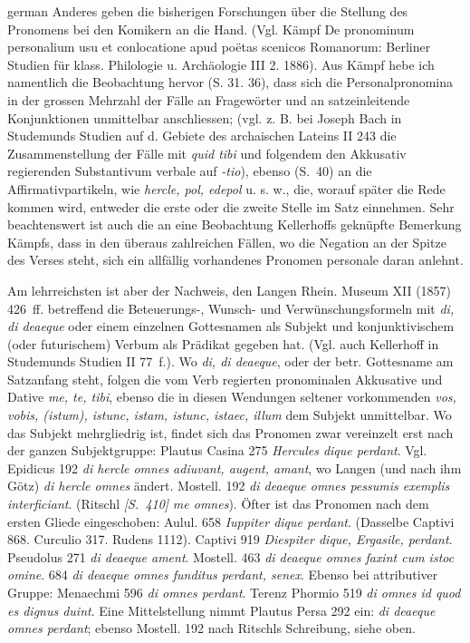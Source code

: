 \begin{otherlanguage*}{german}
Anderes geben die bisherigen Forschungen über die Stellung des Pronomens bei den Komikern an die Hand. (Vgl. Kämpf De pronominum personalium usu et conlocatione apud poëtas scenicos Romanorum: Berliner Studien für klass. Philologie u. Archäologie III 2. 1886). Aus Kämpf hebe ich namentlich die Beobachtung hervor (S. 31. 36), dass sich die Personalpronomina in der grossen Mehrzahl der Fälle an Fragewörter und an satzeinleitende Konjunktionen unmittelbar anschliessen; (vgl. z. B. bei Joseph Bach in Studemunds Studien auf d. Gebiete des archaischen Lateins II 243 die Zusammenstellung der Fälle mit \emph{quid tibi} und folgendem den Akkusativ regierenden Substantivum verbale auf \emph{-tio}), ebenso (S.~40) an die Affirmativpartikeln, wie \emph{hercle, pol, edepol} u. s. w., die, worauf später die Rede kommen wird, entweder die erste oder die zweite Stelle im Satz einnehmen. Sehr beachtenswert ist auch die an eine Beobachtung Kellerhoffs geknüpfte Bemerkung Kämpfs, dass in den überaus zahlreichen Fällen, wo die Negation an der Spitze des Verses steht, sich ein allfällig vorhandenes Pronomen personale daran anlehnt.

Am lehrreichsten ist aber der Nachweis, den Langen Rhein. Museum XII (1857) 426~ff. betreffend die Beteuerungs-, Wunsch- und Verwünschungsformeln mit \emph{di, di deaeque} oder einem einzelnen Gottesnamen als Subjekt und konjunktivischem (oder futurischem) Verbum als Prädikat gegeben hat. (Vgl. auch Kellerhoff in Studemunds Studien II 77~f.). Wo \emph{di, di deaeque}, oder der betr. Gottesname am Satzanfang steht, folgen die vom Verb regierten pronominalen Akkusative und Dative \emph{me, te, tibi}, ebenso die in diesen Wendungen seltener vorkommenden \emph{vos, vobis, (istum), istunc, istam, istunc, istaec, illum} dem Subjekt unmittelbar. Wo das Subjekt mehrgliedrig ist, findet sich das Pronomen zwar vereinzelt erst nach der ganzen Subjektgruppe: Plautus Casina 275 \emph{Hercules dique  perdant}. Vgl. Epidicus 192 \emph{di hercle omnes  adiuvant, augent, amant}, wo Langen (und nach ihm Götz) \emph{di  hercle omnes} ändert. Mostell. 192 \emph{di deaeque omnes  pessumis exemplis interficiant}. (Ritschl  \hypertarget{p410}{\emph{[S.~410]}}\label{p410} \emph{me omnes}). Öfter ist das Pronomen nach dem ersten Gliede eingeschoben: Aulul. 658 \emph{Iuppiter  dique perdant}. (Dasselbe Captivi 868. Curculio 317. Rudens 1112). Captivi 919 \emph{Diespiter  dique, Ergasile, perdant}. Pseudolus 271 \emph{di  deaeque ament}. Mostell. 463 \emph{di  deaeque omnes faxint cum istoc omine}. 684 \emph{di  deaeque omnes funditus perdant, senex}. Ebenso bei attributiver Gruppe: Menaechmi 596 \emph{di  omnes perdant}. Terenz Phormio 519 \emph{di  omnes id quod es dignus duint}. Eine Mittelstellung nimmt Plautus Persa 292 ein: \emph{di deaeque  omnes perdant}; ebenso Mostell. 192 nach Ritschls Schreibung, siehe oben.


\end{otherlanguage*}

